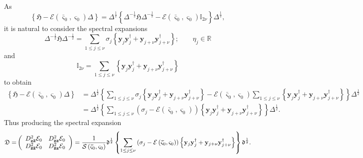 \documentclass[aps,preprint]{revtex4}%
\begin{document}
As%
\begin{equation}
\left\{  \mathfrak{H}-\mathcal{E}\left(  \mathbf{\bar{\varsigma}}%
_{0},\mathbf{\varsigma}_{0}\right)  \mathfrak{\Delta}\right\}
=\mathfrak{\Delta}^{\frac{1}{2}}\left\{  \mathfrak{\Delta}^{-\frac{1}{2}%
}\mathfrak{H\Delta}^{-\frac{1}{2}}-\mathcal{E}\left(  \mathbf{\bar{\varsigma}%
}_{0},\mathbf{\varsigma}_{0}\right)  \mathbb{I}_{2\nu}\right\}
\mathfrak{\Delta}^{\frac{1}{2}},
\end{equation}
it is natural to consider the spectral expansions
\begin{equation}
\mathfrak{\Delta}^{-\frac{1}{2}}\mathfrak{H\Delta}^{-\frac{1}{2}}=\sum_{1\leq
j\leq\nu}\sigma_{j}\left\{  \mathbf{y}_{j}\mathbf{y}_{j}^{\dagger}%
+\mathbf{y}_{j+\nu}\mathbf{y}_{j+\nu}^{\dagger}\right\}  ;\qquad\eta_{j}%
\in\mathbb{R}%
\end{equation}
and
\begin{equation}
\mathbb{I}_{2\nu}=\sum_{1\leq j\leq\nu}\left\{  \mathbf{y}_{j}\mathbf{y}%
_{j}^{\dagger}+\mathbf{y}_{j+\nu}\mathbf{y}_{j+\nu}^{\dagger}\right\}
\end{equation}
to obtain
\begin{align}
\left\{  \mathfrak{H}-\mathcal{E}\left(  \mathbf{\bar{\varsigma}}%
_{0},\mathbf{\varsigma}_{0}\right)  \mathfrak{\Delta}\right\}   &
=\mathfrak{\Delta}^{\frac{1}{2}}\left\{  \sum_{1\leq j\leq\nu}\sigma
_{j}\left\{  \mathbf{y}_{j}\mathbf{y}_{j}^{\dagger}+\mathbf{y}_{j+\nu
}\mathbf{y}_{j+\nu}^{\dagger}\right\}  -\mathcal{E}\left(  \mathbf{\bar
{\varsigma}}_{0},\mathbf{\varsigma}_{0}\right)  \sum_{1\leq j\leq\nu}\left\{
\mathbf{y}_{j}\mathbf{y}_{j}^{\dagger}+\mathbf{y}_{j+\nu}\mathbf{y}_{j+\nu
}^{\dagger}\right\}  \right\}  \mathfrak{\Delta}^{\frac{1}{2}}\nonumber\\
&  =\mathfrak{\Delta}^{\frac{1}{2}}\left\{  \sum_{1\leq j\leq\nu}\left(
\sigma_{j}-\mathcal{E}\left(  \mathbf{\bar{\varsigma}}_{0},\mathbf{\varsigma
}_{0}\right)  \right)  \left\{  \mathbf{y}_{j}\mathbf{y}_{j}^{\dagger
}+\mathbf{y}_{j+\nu}\mathbf{y}_{j+\nu}^{\dagger}\right\}  \right\}
\mathfrak{\Delta}^{\frac{1}{2}}.
\end{align}
Thus producing the spectral expansion
\begin{equation}
\mathfrak{D=}\left(
\begin{array}
[c]{cc}%
D_{\mathbf{z\bar{z}}}^{2}\mathcal{E}_{0} & D_{\mathbf{zz}}^{2}\mathcal{E}%
_{0}\\
D_{\mathbf{\bar{z}\bar{z}}}^{2}\mathcal{E}_{0} & D_{\mathbf{\bar{z}z}}%
^{2}\mathcal{E}_{0}%
\end{array}
\right)  =\frac{1}{\mathcal{S}\left(  \mathbf{\bar{\varsigma}}_{0}%
,\mathbf{\varsigma}_{0}\right)  }\mathfrak{\Delta}^{\frac{1}{2}}\left\{
\sum_{1\leq j\leq\nu}\left(  \sigma_{j}-\mathcal{E}\left(  \mathbf{\bar
{\varsigma}}_{0},\mathbf{\varsigma}_{0}\right)  \right)  \left\{
\mathbf{y}_{j}\mathbf{y}_{j}^{\dagger}+\mathbf{y}_{j+\nu}\mathbf{y}_{j+\nu
}^{\dagger}\right\}  \right\}  \mathfrak{\Delta}^{\frac{1}{2}}.
\end{equation}
\end{document}
